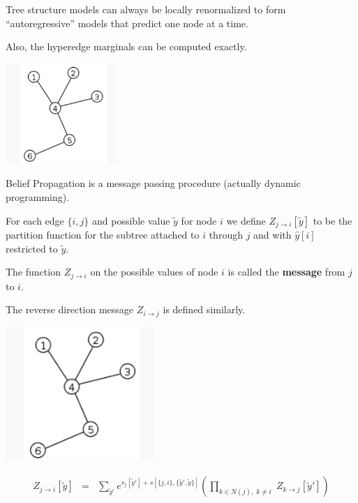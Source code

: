 {\vfill
Tree structure models can always be locally renormalized to form ``autoregressive'' models that
predict one node at a time.

\vfill
Also, the hyperedge marginals can be computed exactly.



\centerline{\includegraphics[height=1.5in]{../images/Tree}}

\vfill
Belief Propagation is a message passing procedure (actually dynamic programming).

\vfill
For each edge $\{i,j\}$ and possible value $\tilde{y}$ for node $i$ we define {\color{red} $Z_{j \rightarrow i}[\tilde{y}]$}
to be  the partition function for the subtree attached to $i$ through $j$ and
with $\hat{y}[i]$ restricted to $\tilde{y}$.

\vfill
The function $Z_{j \rightarrow i}$ on the possible values of node $i$ is called the {\bf message} from $j$ to $i$.

\vfill
The reverse direction message $Z_{i \rightarrow j}$ is defined similarly.


\centerline{\includegraphics[height=2.0in]{../images/Tree}}

\vfill
\begin{eqnarray*}
  Z_{j\rightarrow i}[\tilde{y}] & = & \sum_{\tilde{y}'}  e^{s_j[\tilde{y}'] + s[\{j,i\},\{\tilde{y}',\tilde{y}\}]}
    \left(\prod_{k \in N(j),\;k \not = i}\;Z_{k\rightarrow j}[\tilde{y}']\right)
\end{eqnarray*}

}
